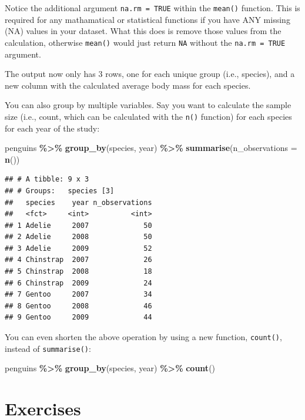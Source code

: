 \documentclass[
]{book}
\newenvironment{Shaded}{\begin{snugshade}}{\end{snugshade}}
\newcommand{\AttributeTok}[1]{\textcolor[rgb]{0.13,0.29,0.53}{#1}}
\newcommand{\FunctionTok}[1]{\textcolor[rgb]{0.13,0.29,0.53}{\textbf{#1}}}
\newcommand{\NormalTok}[1]{#1}
\newcommand{\SpecialCharTok}[1]{\textcolor[rgb]{0.81,0.36,0.00}{\textbf{#1}}}
\begin{document}
Notice the additional argument \texttt{na.rm\ =\ TRUE} within the \texttt{mean()} function. This is required for any mathamatical or statistical functions if you have ANY missing (NA) values in your dataset. What this does is remove those values from the calculation, otherwise \texttt{mean()} would just return \texttt{NA} without the \texttt{na.rm\ =\ TRUE} argument.

The output now only has 3 rows, one for each unique group (i.e., species), and a new column with the calculated average body mass for each species.

You can also group by multiple variables. Say you want to calculate the sample size (i.e., count, which can be calculated with the \texttt{n()} function) for each species for each year of the study:

\begin{Shaded}
\begin{Highlighting}[]
\NormalTok{penguins }\SpecialCharTok{\%\textgreater{}\%} 
  \FunctionTok{group\_by}\NormalTok{(species, year) }\SpecialCharTok{\%\textgreater{}\%} 
  \FunctionTok{summarise}\NormalTok{(}\AttributeTok{n\_observations =} \FunctionTok{n}\NormalTok{())}
\end{Highlighting}
\end{Shaded}

\begin{verbatim}
## # A tibble: 9 x 3
## # Groups:   species [3]
##   species    year n_observations
##   <fct>     <int>          <int>
## 1 Adelie     2007             50
## 2 Adelie     2008             50
## 3 Adelie     2009             52
## 4 Chinstrap  2007             26
## 5 Chinstrap  2008             18
## 6 Chinstrap  2009             24
## 7 Gentoo     2007             34
## 8 Gentoo     2008             46
## 9 Gentoo     2009             44
\end{verbatim}

You can even shorten the above operation by using a new function, \texttt{count()}, instead of \texttt{summarise()}:

\begin{Shaded}
\begin{Highlighting}[]
\NormalTok{penguins }\SpecialCharTok{\%\textgreater{}\%} 
  \FunctionTok{group\_by}\NormalTok{(species, year) }\SpecialCharTok{\%\textgreater{}\%} 
  \FunctionTok{count}\NormalTok{()}
\end{Highlighting}
\end{Shaded}

\hypertarget{exercises-2}{%
\section{Exercises}\label{exercises-2}}
\end{document}
